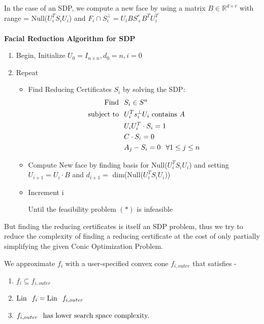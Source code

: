\documentclass[twoside]{article}
\begin{document}
\begin{multicols}{2}
In the case of an SDP, we compute a new face by using a matrix $B \in \mathbb{R}^{d \times r}$ with range = Null($U_i^TS_iU_i$) and $F_i \cap S_i^{\perp} = U_iBS^r_+B^TU_i^T$
\\
\\\textbf{\color{blue}Facial Reduction Algorithm for SDP}
\begin{enumerate}
	\item Begin, Initialize $U_0 = I_{n\times n}, d_0 = n, i=0$
	\item Repeat
	\begin{itemize}
		\item Find Reducing Certificates $S_i$ by solving the SDP: 
			\begin{align*}
			\mbox{Find} \hspace{0.1in} & S_i \in S^n \\
			\mbox{subject to} \hspace{0.1in} & U_i^Ts_i^{\perp}U_i \mbox{ contains } A \\
			& U_iU_i^T\cdot S_i = 1\\
			& C\cdot S_i = 0\\
			& A_j - S_i = 0 \hspace{0.1in}\forall 1 \leq j \leq n
            \end{align*}
		\item Compute New face by finding basis for Null($U_i^TS_iU_i$) and setting $U_{i+1} = U_i\cdot B$ and $d_{i+1} =$ dim(Null($U_i^TS_iU_i$))
		\item Increment i 
	       
	          Until the feasibility problem $(*)$ is infeasible
    \end{itemize}
\end{enumerate}


But finding the reducing certificates is itself an SDP problem, thus we try to reduce the complexity of finding a reducing certificate at the cost of only partially simplifying the given Conic Optimization Problem.

We approximate $f_i$ with a user-specified  convex cone $f_{i,outer}$ that satisfies - 
\begin{enumerate}
    \item $f_i \subseteq f_{i,outer}$
    \item $\mbox{Lin} \hspace{0.1in} f_i = \mbox{Lin} \hspace{0.1in} f_{i,outer}$
    \item $f_{i,outer} \hspace{0.1in} \mbox{has lower search space complexity.}$
\end{enumerate}


\end{multicols}
\end{document}
